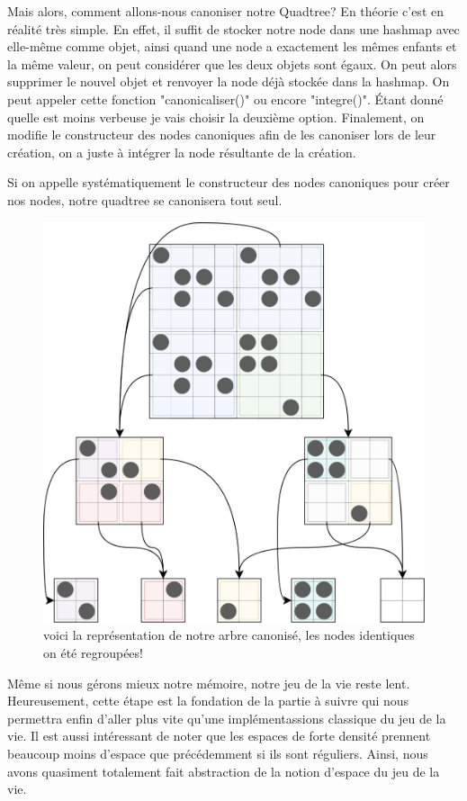 Mais alors, comment allons-nous canoniser notre Quadtree? En théorie c'est en réalité très simple. En effet, il suffit de stocker notre node dans une hashmap avec elle-même comme objet, ainsi quand une node a exactement les mêmes enfants et la même valeur, on peut considérer que les deux objets sont égaux. On peut alors supprimer le nouvel objet et renvoyer la node déjà stockée dans la hashmap. On peut appeler cette fonction "canonicaliser()" ou encore "integre()". Étant donné quelle est moins verbeuse je vais choisir la deuxième option. Finalement, on modifie le constructeur des nodes canoniques afin de les canoniser lors de leur création, on a juste à intégrer la node résultante de la création.

Si on appelle systématiquement le constructeur des nodes canoniques pour créer nos nodes, notre quadtree se canonisera tout seul.

\begin{figure}[H]
        \center
        \includegraphics[scale=0.16]{images/imgHashlife/quadtreecanonique.png}
        \caption{voici la représentation de notre arbre canonisé, les nodes identiques on été regroupées!}
\end{figure}

Même si nous gérons mieux notre mémoire, notre jeu de la vie reste lent. Heureusement, cette étape est la fondation de la partie à suivre qui nous permettra enfin d'aller plus vite qu'une implémentassions classique du jeu de la vie. Il est aussi intéressant de noter que les espaces de forte densité prennent beaucoup moins d'espace que précédemment si ils sont réguliers. Ainsi, nous avons quasiment totalement fait abstraction de la notion d'espace du jeu de la vie.


